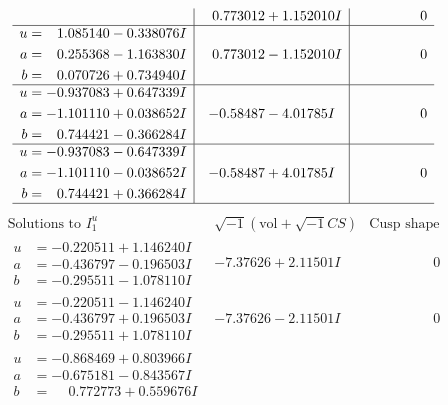\documentclass[1p]{elsarticle_modified}
\theoremstyle{definition}
\newcommand{\I}{\sqrt{-1}}
\begin{document}
$$\begin{array}{c|c|c}
 & \phantom{-}0.773012 + 1.152010 I & \phantom{-0.000000 } 0 \\ \hline\begin{aligned}
u &= \phantom{-}1.085140 - 0.338076 I \\
a &= \phantom{-}0.255368 - 1.163830 I \\
b &= \phantom{-}0.070726 + 0.734940 I\end{aligned}
 & \phantom{-}0.773012 - 1.152010 I & \phantom{-0.000000 } 0 \\ \hline\begin{aligned}
u &= -0.937083 + 0.647339 I \\
a &= -1.101110 + 0.038652 I \\
b &= \phantom{-}0.744421 - 0.366284 I\end{aligned}
 & -0.58487 - 4.01785 I & \phantom{-0.000000 } 0 \\ \hline\begin{aligned}
u &= -0.937083 - 0.647339 I \\
a &= -1.101110 - 0.038652 I \\
b &= \phantom{-}0.744421 + 0.366284 I\end{aligned}
 & -0.58487 + 4.01785 I & \phantom{-0.000000 } 0\\
 \hline 
 \end{array}$$\newpage$$\begin{array}{c|c|c}  
\text{Solutions to }I^u_{1}& \I (\text{vol} + \sqrt{-1}CS) & \text{Cusp shape}\\
 \hline 
\begin{aligned}
u &= -0.220511 + 1.146240 I \\
a &= -0.436797 - 0.196503 I \\
b &= -0.295511 - 1.078110 I\end{aligned}
 & -7.37626 + 2.11501 I & \phantom{-0.000000 } 0 \\ \hline\begin{aligned}
u &= -0.220511 - 1.146240 I \\
a &= -0.436797 + 0.196503 I \\
b &= -0.295511 + 1.078110 I\end{aligned}
 & -7.37626 - 2.11501 I & \phantom{-0.000000 } 0 \\ \hline\begin{aligned}
u &= -0.868469 + 0.803966 I \\
a &= -0.675181 - 0.843567 I \\
b &= \phantom{-}0.772773 + 0.559676 I\end{aligned}

\end{array}$$
\end{document}
